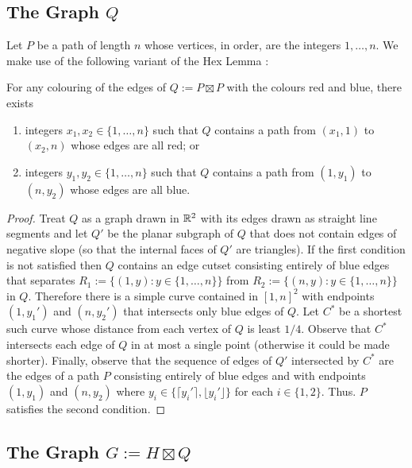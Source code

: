 \documentclass[kpfonts]{patmorin}
\begin{document}
\subsection{The Graph $Q$}

Let $P$ be a path of length $n$ whose vertices, in order, are the integers $1,\ldots,n$.  We make use of the following variant of the Hex Lemma \cite{X}:

\begin{lem}
    For any colouring of the edges of $Q:=P\boxtimes P$ with the colours red and blue, there exists
    \begin{enumerate}
        \item integers $x_1,x_2\in\{1,\ldots,n\}$ such that $Q$ contains a path from $(x_1,1)$ to $(x_2,n)$ whose edges are all red; or
        \item integers $y_1,y_2\in\{1,\ldots,n\}$ such that $Q$ contains a path from $(1,y_1)$ to $(n,y_2)$ whose edges are all blue.
    \end{enumerate}
\end{lem}

\begin{proof}
    Treat $Q$ as a graph drawn in $\mathbb{R}^2$ with its edges drawn as straight line segments and let $Q'$ be the planar subgraph of $Q$ that does not contain edges of negative slope (so that the internal faces of $Q'$ are triangles).  If the first condition is not satisfied then $Q$ contains an edge cutset consisting entirely of blue edges that separates $R_1:=\{(1,y):y\in\{1,\ldots,n\}\}$ from $R_2:=\{(n,y):y\in\{1,\ldots,n\}\}$ in $Q$.  Therefore there is a simple curve contained in $[1,n]^2$ with endpoints $(1,y_1')$ and $(n,y_2')$ that intersects only blue edges of $Q$.  Let $C^*$ be a shortest such curve whose distance from each vertex of $Q$ is least $1/4$.  Observe that $C^*$ intersects each edge of $Q$ in at most a single point (otherwise it could be made shorter).  Finally, observe that the sequence of edges of $Q'$ intersected by $C^*$ are the edges of a path $P$ consisting entirely of blue edges and with endpoints $(1,y_1)$ and $(n,y_2)$ where $y_i\in\{\lceil y_i'\rceil, \lfloor y_i'\rfloor\}$ for each $i\in\{1,2\}$. Thus. $P$ satisfies the second condition.
\end{proof}

\subsection{The Graph $G:=H\boxtimes Q$}
\end{document}
